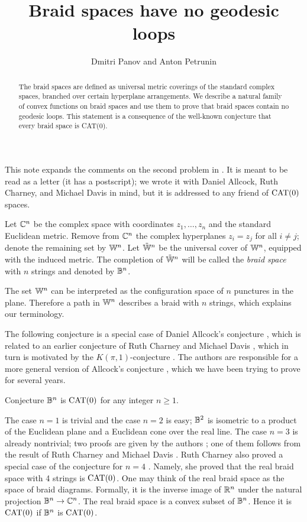 \documentclass[a4paper,10pt]{article}
\def\thetitle{Braid spaces have no geodesic loops}
\def\theauthors{Dmitri Panov and Anton Petrunin}
\begin{document}
\title{\thetitle}
\author{\theauthors}
\date{}
\maketitle

\begin{abstract}
The braid spaces are defined as universal metric coverings of the standard complex spaces, branched over certain hyperplane arrangements.
We describe a natural family of convex functions on braid spaces and use them to prove that braid spaces contain no geodesic loops.
This statement is a consequence of the well-known conjecture that every braid space is CAT(0).
\end{abstract}

This note expands the comments on the second problem in \cite{petrunin2026}.
It is meant to be read as a letter (it has a postscript); we wrote it with Daniel Allcock, Ruth Charney, and Michael Davis in mind, but it is addressed to any friend of $\operatorname{\rm CAT}(0)$ spaces.

Let $\mathbb{C}^n$ be the complex space
with coordinates $z_1,\ldots,z_n$ and the standard Euclidean metric.
Remove from $\mathbb{C}^n$ the complex hyperplanes $z_i=z_j$ for all $i\ne j$;
denote the remaining set by $\mathbb{W}^n$.
Let $\tilde {\mathbb{W}}^n$ be the universal cover of $\mathbb{W}^n$, equipped with the induced metric.
The completion of $\tilde {\mathbb{W}}^n$ will be called the \emph{braid space}
with $n$ strings and denoted by $\mathbb{B}^n$.

The set $\mathbb{W}^n$ can be interpreted as the configuration space of $n$ punctures in the plane.
Therefore a path in $\mathbb{W}^n$ describes a braid with $n$ strings, which explains our terminology.

The following conjecture is a special case of Daniel Allcock's conjecture \cite[Conjecture 1.4]{allcock}, which is related to an earlier conjecture of Ruth Charney and Michael Davis \cite[Conjecture 3]{charney-davis-95}, which in turn is motivated by the $K(\pi,1)$-conjecture \cite{vanderlek,paris}.
The authors are responsible for a more general version of Allcock's conjecture \cite[Conjecture 1.1]{panov-petrunin}, which we have been trying to prove for several years.

\begin{thm}{Conjecture}\label{braid-conj}
$\mathbb{B}^n$ is $\operatorname{\rm CAT}(0)$ for any integer $n\ge 1$.
\end{thm}

The case $n=1$ is trivial and the case $n=2$ is easy; $\mathbb{B}^2$ is isometric to a product of the Euclidean plane and a Euclidean cone over the real line.
The case $n=3$ is already nontrivial;
two proofs are given by the authors \cite{panov-petrunin};
one of them follows from the result of Ruth Charney and Michael Davis \cite{charney-davis-93}.
Ruth Charney also proved a special case of the conjecture for $n=4$ \cite[Theorem~5.4]{charney2004}.
Namely, she proved that the real braid space with 4 strings is $\operatorname{\rm CAT}(0)$.
One may think of the real braid space as the space of braid diagrams.
Formally, it is the inverse image of $\mathbb{R}^n$ under the natural projection $\mathbb{B}^n\to \mathbb{C}^n$.
The real braid space is a convex subset of $\mathbb{B}^n$. Hence it is $\operatorname{\rm CAT}(0)$ if $\mathbb{B}^n$ is $\operatorname{\rm CAT}(0)$.
\end{document}
